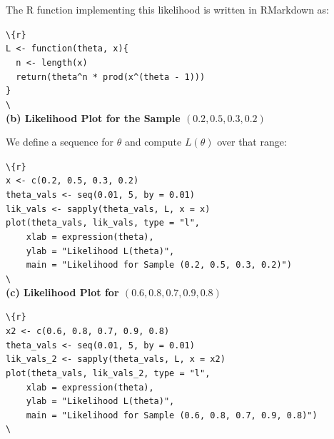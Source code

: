 \documentclass[11pt,letterpaper]{article}
\theoremstyle{remark}
\begin{document}
The R function implementing this likelihood is written in RMarkdown as:

\texttt{\textbackslash{}\textbacktick{}\textbacktick{}\textbacktick\{r\}} \\
\texttt{L <- function(theta, x)\{} \\
\texttt{\ \ n <- length(x)} \\
\texttt{\ \ return(theta\^{}n * prod(x\^{}(theta - 1)))} \\
\texttt{\}} \\
\texttt{\textbackslash{}\textbacktick{}\textbacktick{}\textbacktick} \\

\medskip
\noindent\textbf{(b) Likelihood Plot for the Sample $(0.2, 0.5, 0.3, 0.2)$}

We define a sequence for $\theta$ and compute $L(\theta)$ over that range:

\texttt{\textbackslash{}\textbacktick{}\textbacktick{}\textbacktick\{r\}} \\
\texttt{x <- c(0.2, 0.5, 0.3, 0.2)} \\
\texttt{theta\_vals <- seq(0.01, 5, by = 0.01)} \\
\texttt{lik\_vals <- sapply(theta\_vals, L, x = x)} \\[4pt]
\texttt{plot(theta\_vals, lik\_vals, type = "l",} \\
\texttt{\ \ \ \ xlab = expression(theta),} \\
\texttt{\ \ \ \ ylab = "Likelihood L(theta)",} \\
\texttt{\ \ \ \ main = "Likelihood for Sample (0.2, 0.5, 0.3, 0.2)")} \\
\texttt{\textbackslash{}\textbacktick{}\textbacktick{}\textbacktick} \\

\medskip
\noindent\textbf{(c) Likelihood Plot for $(0.6, 0.8, 0.7, 0.9, 0.8)$}

\texttt{\textbackslash{}\textbacktick{}\textbacktick{}\textbacktick\{r\}} \\
\texttt{x2 <- c(0.6, 0.8, 0.7, 0.9, 0.8)} \\
\texttt{theta\_vals <- seq(0.01, 5, by = 0.01)} \\
\texttt{lik\_vals\_2 <- sapply(theta\_vals, L, x = x2)} \\[4pt]
\texttt{plot(theta\_vals, lik\_vals\_2, type = "l",} \\
\texttt{\ \ \ \ xlab = expression(theta),} \\
\texttt{\ \ \ \ ylab = "Likelihood L(theta)",} \\
\texttt{\ \ \ \ main = "Likelihood for Sample (0.6, 0.8, 0.7, 0.9, 0.8)")} \\
\texttt{\textbackslash{}\textbacktick{}\textbacktick{}\textbacktick} \\
\end{document}
